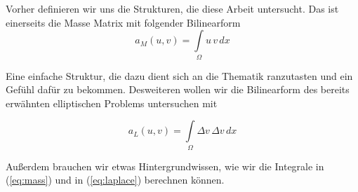 Vorher definieren wir uns die Strukturen, die diese Arbeit untersucht. Das ist einerseits die Masse Matrix mit folgender Bilinearform
\begin{equation} \label{eq:mass}
a_M(u,v)= \int\limits_{\Omega} u \, v \, dx
\end{equation}

Eine einfache Struktur, die dazu dient sich an die Thematik ranzutasten und ein Gefühl dafür zu bekommen. Desweiteren wollen wir die Bilinearform des bereits erwähnten elliptischen Problems untersuchen mit

\begin{equation} \label{eq:laplace}
a_L(u,v) = \int\limits_{\Omega} \Delta v \, \Delta v \, dx
\end{equation}

Außerdem brauchen wir etwas Hintergrundwissen, wie wir die Integrale in (\ref{eq:mass}) und in (\ref{eq:laplace}) berechnen können.




